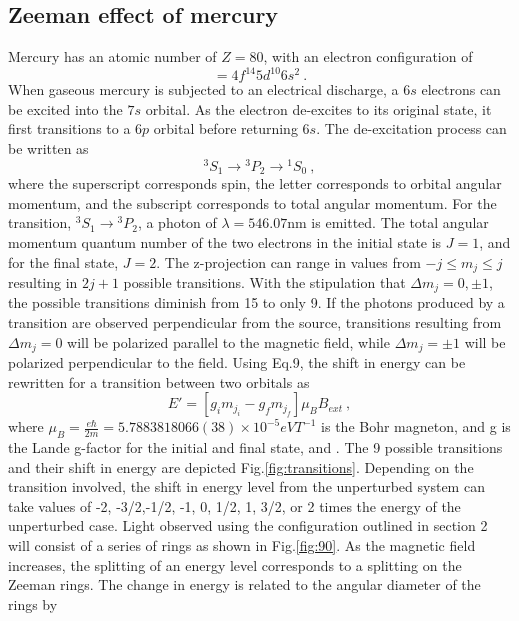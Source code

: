 \documentclass[12pt]{article}
\begin{document}
\subsection{Zeeman effect of mercury}
Mercury has an atomic number of $Z=80$, with an electron configuration of 
\begin{equation}
[\text{Xe}] = 4f^{14}5d^{10}6s^2\:.
\end{equation}
When gaseous mercury is subjected to an electrical discharge, a $6s$ electrons can be excited into the $7s$ orbital. As the electron de-excites to its original state, it first transitions to a $6p$ orbital before returning $6s$. The de-excitation process can be written as
\begin{equation}
{}^3S_1 \longrightarrow {}^3P_2 \longrightarrow {}^1S_0\:,
\end{equation}
where the superscript corresponds spin, the letter corresponds to orbital angular momentum, and the subscript corresponds to total angular momentum. For the transition, ${}^3S_1 \longrightarrow {}^3P_2$, a photon of $\lambda = 546.07$nm is emitted. The total angular momentum quantum number of the two electrons in the initial state is $J=1$, and for the final state, $J=2$. The z-projection can range in values from $-j\leq m_j \leq j$ resulting in $2j+1$ possible transitions. With the stipulation that $\Delta m_j = 0,\pm 1$, the possible transitions diminish from 15 to only 9. \cite{manual} If the photons produced by a transition are observed perpendicular from the source, transitions resulting from $\Delta m_j = 0$ will be polarized parallel to the magnetic field, while $\Delta m_j = \pm 1$ will be polarized perpendicular to the field. Using Eq.9, the shift in energy can be rewritten for a transition between two orbitals as
\begin{equation}
E' = [g_im_{j_i} - g_f m_{j_f}]\mu_B B_{ext}\:,
\end{equation}
where $\mu_B = \frac{e\hbar}{2m} = 5.788 381 8066(38)\times 10^{-5}\textit{eVT}^{-1}$ \cite{pdg} is the Bohr magneton, and g is the Lande g-factor for the initial and final state, and . The 9 possible transitions and their shift in energy are depicted Fig.\ref{fig:transitions}. Depending on the transition involved, the shift in energy level from the unperturbed system can take values of -2, -3/2,-1/2, -1, 0, 1/2, 1, 3/2, or 2 times the energy of the unperturbed case.  Light observed using the configuration outlined in section 2 will consist of a series of rings as shown in Fig.\ref{fig:90}. As the magnetic field increases, the splitting of an energy level corresponds to a splitting on the Zeeman rings. The change in energy is related to the angular diameter of the rings by
\end{document}
